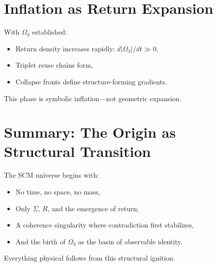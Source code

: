 \section{Inflation as Return Expansion} \label{sec:inflation-start}

With $\Omega_3$ established:
\begin{itemize}
  \item Return density increases rapidly: $d|\Omega_3|/dt \gg 0$,
  \item Triplet reuse chains form,
  \item Collapse fronts define structure-forming gradients.
\end{itemize}

This phase is symbolic inflation—not geometric expansion.

\section{Summary: The Origin as Structural Transition} \label{sec:origin-summary}

The SCM universe begins with:
\begin{itemize}
  \item No time, no space, no mass,
  \item Only $\Sigma$, $R$, and the emergence of return,
  \item A coherence singularity where contradiction first stabilizes,
  \item And the birth of $\Omega_3$ as the basin of observable identity.
\end{itemize}

Everything physical follows from this structural ignition.


